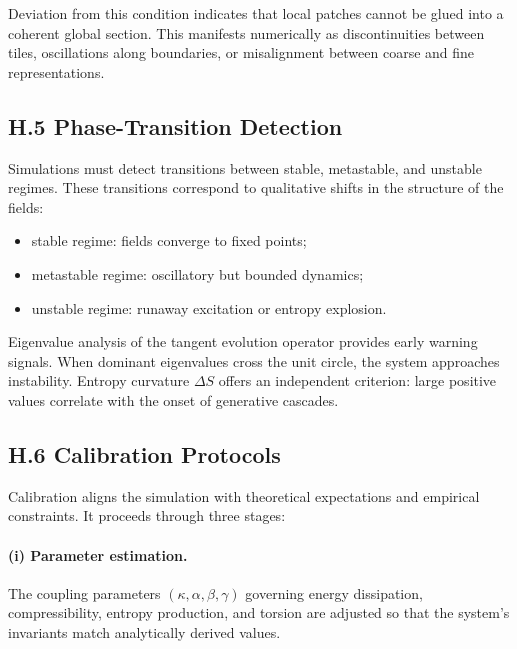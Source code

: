 \documentclass[12pt]{article}
\begin{document}
Deviation from this condition indicates that local patches cannot be glued into 
a coherent global section.  
This manifests numerically as discontinuities between tiles, oscillations along 
boundaries, or misalignment between coarse and fine representations.

\subsection*{H.5 Phase-Transition Detection}

Simulations must detect transitions between stable, metastable, and unstable 
regimes.  
These transitions correspond to qualitative shifts in the structure of the 
fields:

\begin{itemize}
\item stable regime: fields converge to fixed points;
\item metastable regime: oscillatory but bounded dynamics;
\item unstable regime: runaway excitation or entropy explosion.
\end{itemize}

Eigenvalue analysis of the tangent evolution operator provides early warning 
signals.  
When dominant eigenvalues cross the unit circle, the system approaches 
instability.  
Entropy curvature $\Delta S$ offers an independent criterion: large positive 
values correlate with the onset of generative cascades.

\subsection*{H.6 Calibration Protocols}

Calibration aligns the simulation with theoretical expectations and empirical 
constraints.  
It proceeds through three stages:

\paragraph{(i) Parameter estimation.}  
The coupling parameters $(\kappa, \alpha, \beta, \gamma)$ governing energy 
dissipation, compressibility, entropy production, and torsion are adjusted so 
that the system’s invariants match analytically derived values.
\end{document}
